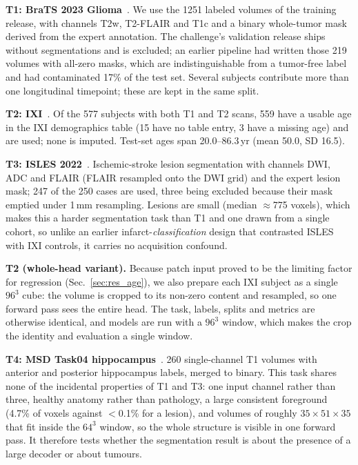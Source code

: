 \documentclass[journal,twoside,web]{ieeecolor}
\begin{document}
\textbf{T1: BraTS 2023 Glioma}~\cite{brats2023}. We use the 1251 labeled volumes of the training release, with channels T2w, T2-FLAIR and T1c and a binary whole-tumor mask derived from the expert annotation. The challenge's validation release ships without segmentations and is excluded; an earlier pipeline had written those 219 volumes with all-zero masks, which are indistinguishable from a tumor-free label and had contaminated 17\% of the test set. Several subjects contribute more than one longitudinal timepoint; these are kept in the same split.

\textbf{T2: IXI}~\cite{ixi}. Of the 577 subjects with both T1 and T2 scans, 559 have a usable age in the IXI demographics table (15 have no table entry, 3 have a missing age) and are used; none is imputed. Test-set ages span 20.0--86.3\,yr (mean 50.0, SD 16.5).

\textbf{T3: ISLES 2022}~\cite{isles2022}. Ischemic-stroke lesion segmentation with channels DWI, ADC and FLAIR (FLAIR resampled onto the DWI grid) and the expert lesion mask; 247 of the 250 cases are used, three being excluded because their mask emptied under 1\,mm resampling. Lesions are small (median $\approx$775 voxels), which makes this a harder segmentation task than T1 and one drawn from a single cohort, so unlike an earlier infarct-\emph{classification} design that contrasted ISLES with IXI controls, it carries no acquisition confound.

\textbf{T2 (whole-head variant).} Because patch input proved to be the limiting factor for regression (Sec.~\ref{sec:res_age}), we also prepare each IXI subject as a single $96^3$ cube: the volume is cropped to its non-zero content and resampled, so one forward pass sees the entire head. The task, labels, splits and metrics are otherwise identical, and models are run with a $96^3$ window, which makes the crop the identity and evaluation a single window.

\textbf{T4: MSD Task04 hippocampus}~\cite{msd}. 260 single-channel T1 volumes with anterior and posterior hippocampus labels, merged to binary. This task shares none of the incidental properties of T1 and T3: one input channel rather than three, healthy anatomy rather than pathology, a large consistent foreground (4.7\% of voxels against $<$0.1\% for a lesion), and volumes of roughly $35{\times}51{\times}35$ that fit inside the $64^3$ window, so the whole structure is visible in one forward pass. It therefore tests whether the segmentation result is about the presence of a large decoder or about tumours.
\end{document}

